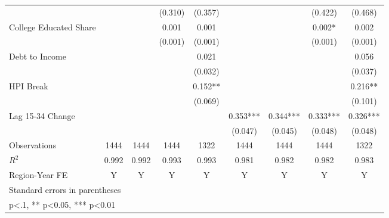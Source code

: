 \begin{table}[htbp]
\begin{tabular}{l*{8}{c}}
                    &            &            &  (0.310)   &  (0.357)   &            &            &  (0.422)   &  (0.468)   \\
\addlinespace
College Educated Share&            &            &    0.001   &    0.001   &            &            &    0.002*  &    0.002   \\
                    &            &            &  (0.001)   &  (0.001)   &            &            &  (0.001)   &  (0.001)   \\
\addlinespace
Debt to Income      &            &            &            &    0.021   &            &            &            &    0.056   \\
                    &            &            &            &  (0.032)   &            &            &            &  (0.037)   \\
\addlinespace
HPI Break           &            &            &            &    0.152** &            &            &            &    0.216** \\
                    &            &            &            &  (0.069)   &            &            &            &  (0.101)   \\
\addlinespace
Lag 15-34 Change    &            &            &            &            &    0.353***&    0.344***&    0.333***&    0.326***\\
                    &            &            &            &            &  (0.047)   &  (0.045)   &  (0.048)   &  (0.048)   \\
\midrule
Observations        &     1444   &     1444   &     1444   &     1322   &     1444   &     1444   &     1444   &     1322   \\
\(R^{2}\)           &    0.992   &    0.992   &    0.993   &    0.993   &    0.981   &    0.982   &    0.982   &    0.983   \\
Region-Year FE      &        Y   &        Y   &        Y   &        Y   &        Y   &        Y   &        Y   &        Y   \\
\bottomrule
\multicolumn{9}{l}{\footnotesize Standard errors in parentheses}\\
\multicolumn{9}{l}{\footnotesize * p<.1, ** p<0.05, *** p<0.01}\\
\end{tabular}
\end{table}
